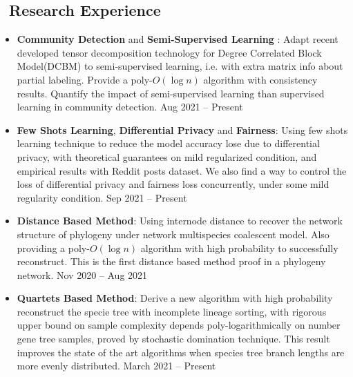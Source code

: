 \documentclass{resume}
\begin{document}
\begin{spacing}{1.0}
		\section{\faTasks\ Research Experience}
		\begin{itemize}
			\item \textbf{Community Detection} and \textbf{Semi-Supervised Learning} : Adapt recent developed tensor decomposition technology for Degree Correlated Block Model(DCBM) to semi-supervised learning, i.e. with extra matrix info about partial labeling. Provide a poly-$O(\log n)$ algorithm with consistency results. Quantify the impact of semi-supervised learning than supervised learning in community detection. \hfill Aug 2021 -- Present
			\item \textbf{Few Shots Learning},   \textbf{Differential Privacy} and \textbf{Fairness}: Using few shots learning technique to reduce the model accuracy lose due to differential privacy, with theoretical guarantees on mild regularized condition, and empirical results with Reddit posts dataset. We also find a way to control the loss of  differential privacy and fairness loss concurrently, under some mild regularity condition. \hfill Sep 2021 -- Present
		\end{itemize}
		
		\vspace{-0.20in}
		
		\begin{itemize}
			\item \textbf{Distance Based Method}: Using internode distance to recover the network structure of phylogeny under network multispecies coalescent model. Also providing a poly-$O(\log n)$ algorithm with high probability to successfully reconstruct. This is the first distance based method proof in a phylogeny network. \hfill Nov 2020 -- Aug 2021
			
			
			
			\item \textbf{Quartets Based Method}: Derive a new algorithm with high probability reconstruct the specie tree with incomplete lineage sorting, with rigorous upper bound on sample complexity depends poly-logarithmically on number gene tree samples, proved by stochastic domination technique. This result improves the state of the art algorithms when species tree branch lengths are more evenly distributed. \hfill March 2021 -- Present
		\end{itemize}
		\vspace{-0.20in}
		

\end{spacing}
\end{document}
